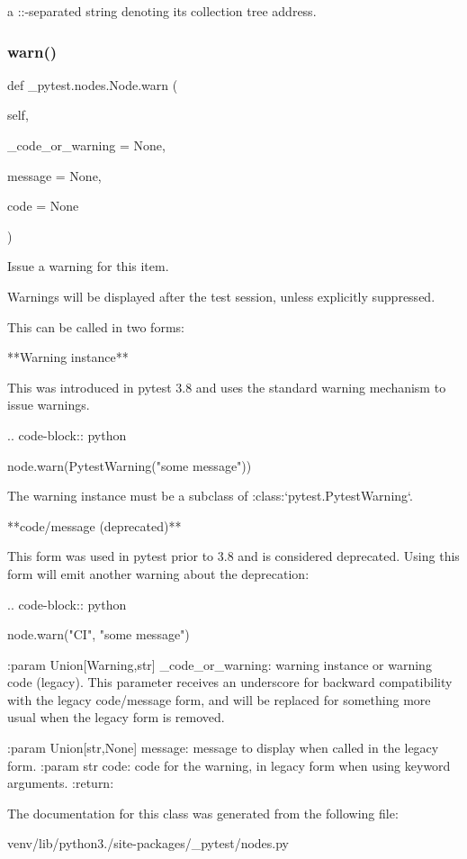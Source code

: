 \begin{DoxyVerb}a ::-separated string denoting its collection tree address. \end{DoxyVerb}
 \mbox{\label{class__pytest_1_1nodes_1_1_node_ab3e0c36e81b150fed632bbcec28cef45}} 
\subsubsection{\texorpdfstring{warn()}{warn()}}
{\footnotesize\ttfamily def \+\_\+pytest.\+nodes.\+Node.\+warn (\begin{DoxyParamCaption}\item[{}]{self,  }\item[{}]{\+\_\+code\+\_\+or\+\_\+warning = {\ttfamily None},  }\item[{}]{message = {\ttfamily None},  }\item[{}]{code = {\ttfamily None} }\end{DoxyParamCaption})}

\begin{DoxyVerb}Issue a warning for this item.

Warnings will be displayed after the test session, unless explicitly suppressed.

This can be called in two forms:

**Warning instance**

This was introduced in pytest 3.8 and uses the standard warning mechanism to issue warnings.

.. code-block:: python

    node.warn(PytestWarning("some message"))

The warning instance must be a subclass of :class:`pytest.PytestWarning`.

**code/message (deprecated)**

This form was used in pytest prior to 3.8 and is considered deprecated. Using this form will emit another
warning about the deprecation:

.. code-block:: python

    node.warn("CI", "some message")

:param Union[Warning,str] _code_or_warning:
    warning instance or warning code (legacy). This parameter receives an underscore for backward
    compatibility with the legacy code/message form, and will be replaced for something
    more usual when the legacy form is removed.

:param Union[str,None] message: message to display when called in the legacy form.
:param str code: code for the warning, in legacy form when using keyword arguments.
:return:
\end{DoxyVerb}
 

The documentation for this class was generated from the following file\+:\begin{DoxyCompactItemize}
\item 
venv/lib/python3./site-\/packages/\+\_\+pytest/nodes.\+py\end{DoxyCompactItemize}
